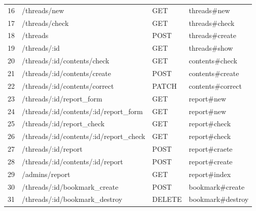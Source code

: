 \documentclass[a4j]{jarticle}
\begin{document}
\begin{table}[htb]
\begin{tabular}{|c|l|l||l|}
	16 &	/threads/new  & GET & threads\#new \\
	17 & /threads/check & GET & threads\#check \\
	18 & /threads & POST & threads\#create \\
  19 & /threads/:id & GET & threads\#show \\ \hline


	20 & /threads/:id/contents/check	& GET & contents\#check \\
	21 & /threads/:id/contents/create & POST  & contents\#create \\
	22 & /threads/:id/contents/correct & PATCH & contents\#correct \\ \hline

  23 & /threads/:id/report\_form & GET & report\#new \\
  24 & /threads/:id/contents/:id/report\_form & GET & report\#new \\
  25 & /threads/:id/report\_check & GET & report\#check \\
  26 & /threads/:id/contents/:id/report\_check & GET & report\#check \\
  27 & /threads/:id/report & POST & report\#craete \\
  28 & /threads/:id/contents/:id/report & POST & report\#create \\
  29 & /admins/report & GET & report\#index \\ \hline

  30 & /threads/:id/bookmark\_create & POST & bookmark\#create \\
  31 & /threads/:id/bookmark\_destroy & DELETE & bookmark\#destroy \\ \hline

\end{tabular}

\end{table}
\end{document}
